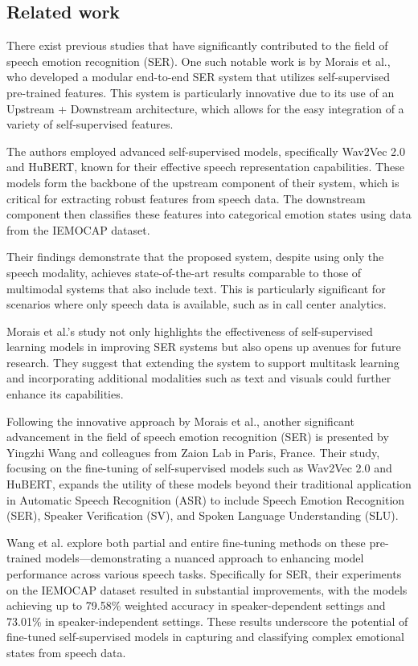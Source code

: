 \documentclass[a4paper,12pt]{article}
\begin{document}
\subsection{Related work}

There exist previous studies that have significantly contributed to the field of speech emotion recognition (SER). One such notable work is by Morais et al., who developed a modular end-to-end SER system that utilizes self-supervised pre-trained features. This system is particularly innovative due to its use of an Upstream + Downstream architecture, which allows for the easy integration of a variety of self-supervised features.

The authors employed advanced self-supervised models, specifically Wav2Vec 2.0 and HuBERT, known for their effective speech representation capabilities. These models form the backbone of the upstream component of their system, which is critical for extracting robust features from speech data. The downstream component then classifies these features into categorical emotion states using data from the IEMOCAP dataset.

Their findings demonstrate that the proposed system, despite using only the speech modality, achieves state-of-the-art results comparable to those of multimodal systems that also include text. This is particularly significant for scenarios where only speech data is available, such as in call center analytics. 

Morais et al.’s study not only highlights the effectiveness of self-supervised learning models in improving SER systems but also opens up avenues for future research. They suggest that extending the system to support multitask learning and incorporating additional modalities such as text and visuals could further enhance its capabilities.

Following the innovative approach by Morais et al., another significant advancement in the field of speech emotion recognition (SER) is presented by Yingzhi Wang and colleagues from Zaion Lab in Paris, France. Their study, focusing on the fine-tuning of self-supervised models such as Wav2Vec 2.0 and HuBERT, expands the utility of these models beyond their traditional application in Automatic Speech Recognition (ASR) to include Speech Emotion Recognition (SER), Speaker Verification (SV), and Spoken Language Understanding (SLU).

Wang et al. explore both partial and entire fine-tuning methods on these pre-trained models—demonstrating a nuanced approach to enhancing model performance across various speech tasks. Specifically for SER, their experiments on the IEMOCAP dataset resulted in substantial improvements, with the models achieving up to 79.58\% weighted accuracy in speaker-dependent settings and 73.01\% in speaker-independent settings. These results underscore the potential of fine-tuned self-supervised models in capturing and classifying complex emotional states from speech data.
\end{document}
